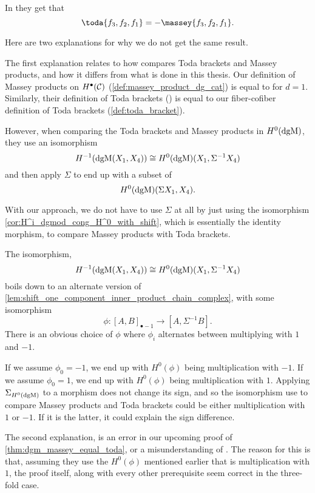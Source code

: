 \begin{remark}
    In \cite[Theorem 4.2.6]{Jasso-Muro_2023} they get that
    \[
        \toda{f_3, f_2, f_1} = -\massey{f_3, f_2, f_1}.
    \]

    Here are two explanations for why we do not get the same result.
    
    The first explanation relates to how \cite{Jasso-Muro_2023} compares Toda brackets and Massey products, and how it differs from what is done in this thesis. Our definition of Massey products on \( H^{\bullet}({\mathcal{C}}) \) (\autoref{def:massey_product_dg_cat}) is equal to \cite[Definition 4.2.1]{Jasso-Muro_2023} for \( d = 1 \). Similarly, their definition of Toda brackets (\cite[Definition 4.1.6]{Jasso-Muro_2023}) is equal to our fiber-cofiber definition of Toda brackets (\autoref{def:toda_bracket}).
    
    However, when comparing the Toda brackets and Massey products in \( H^0(\operatorname{dgM}) \), they use an isomorphism
    \[
        H^{-1}(\operatorname{dgM}(X_1, X_4)) \cong H^0(\operatorname{dgM})(X_1, \Sigma^{-1} X_4)
    \]
    and then apply \( \Sigma \) to end up with a subset of
    \[
        H^0(\operatorname{dgM})(\Sigma X_1, X_4).
    \] 

    With our approach, we do not have to use \( \Sigma \) at all by just using the isomorphism \autoref{cor:H^i_dgmod_cong_H^0_with_shift}, which is essentially the identity morphism, to compare Massey products with Toda brackets.

    The isomorphism,
    \[
        H^{-1}(\operatorname{dgM}(X_1, X_4)) \cong H^0(\operatorname{dgM})(X_1, \Sigma^{-1} X_4)
    \]
    boils down to an alternate version of \autoref{lem:shift_one_component_inner_product_chain_complex}, with some isomorphism
    \[
        \phi: [A, B]_{\bullet - 1} \to [A, \Sigma^{-1} B].
    \]
    There is an obvious choice of \( \phi \) where \( \phi_i \) alternates between multiplying with \( 1 \) and \( -1 \).

    If we assume \( \phi_0 = -1 \), we end up with \( H^0(\phi) \) being multiplication with \( -1 \). If we assume \( \phi_0 = 1 \), we end up with \( H^0(\phi) \) being multiplication with \( 1 \). Applying \( \Sigma_{H^0(\operatorname{dgM})} \) to a morphism does not change its sign, and so the isomorphism \cite{Jasso-Muro_2023} use to compare Massey products and Toda brackets could be either multiplication with \( 1 \) or \( -1 \). If it is the latter, it could explain the sign difference.

    The second explanation, is an error in our upcoming proof of \autoref{thm:dgm_massey_equal_toda}, or a misunderstanding of \cite[Proposition 4.2.8]{Jasso-Muro_2023}. The reason for this is that, assuming they use the \( H^0(\phi) \) mentioned earlier that is multiplication with \( 1 \), the proof itself, along with every other prerequisite seem correct in the three-fold case.


\end{remark}
